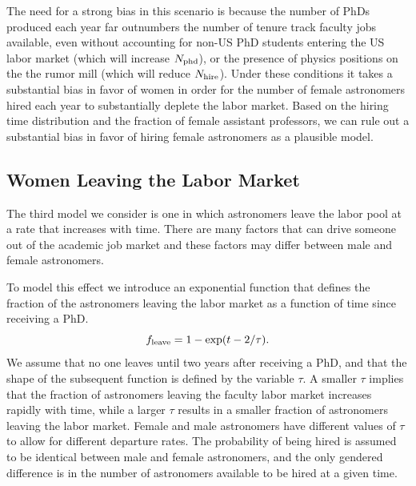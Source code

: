 \documentclass[modern]{aastex62}
\begin{document}
The need for a strong bias in this scenario is because the number of PhDs produced each year far outnumbers the number of tenure track faculty jobs available, even without accounting for non-US PhD students entering the US labor market (which will increase $N_{\rm phd}$), or the presence of physics positions on the the rumor mill (which will reduce $N_{\rm hire}$). Under these conditions it takes a substantial bias in favor of women in order for the number of female astronomers hired each year to substantially deplete the labor market. Based on the hiring time distribution and the fraction of female assistant professors, we can rule out a substantial bias in favor of hiring female astronomers as a plausible model. 

\subsection{Women Leaving the Labor Market}
The third model we consider is one in which astronomers leave the labor pool at a rate that increases with time. There are many factors that can drive someone out of the academic job market and these factors may differ between male and female astronomers.

To model this effect we introduce an exponential function that defines the fraction of the astronomers leaving the labor market as a function of time since receiving a PhD.
\begin{equation}
f_{\rm leave} = 1-\exp (t-2/\tau).
\end{equation}
We assume that no one leaves until two years after receiving a PhD, and that the shape of the subsequent function is defined by the variable $\tau$. A smaller $\tau$ implies that the fraction of astronomers leaving the faculty labor market increases rapidly with time, while a larger $\tau$ results in a smaller fraction of astronomers leaving the labor market. Female and male astronomers have different values of $\tau$ to allow for different departure rates. The probability of being hired is assumed to be identical between male and female astronomers, and the only gendered difference is in the number of astronomers available to be hired at a given time. 
\end{document}
